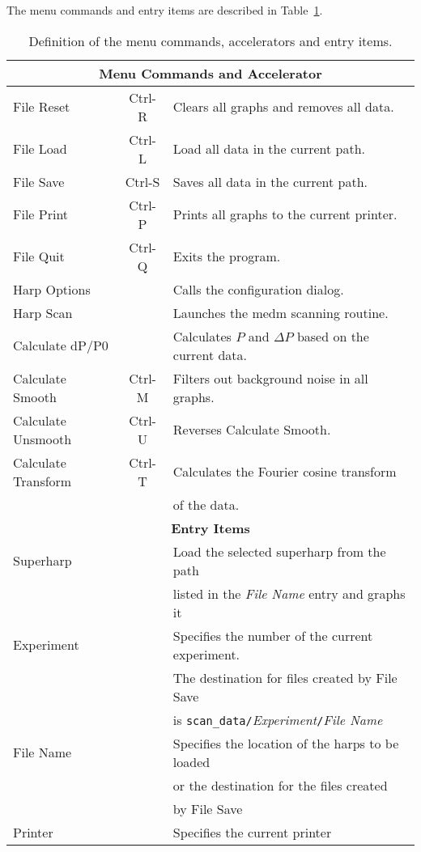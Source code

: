 {The menu commands and entry items are described in Table~\ref{table:menu_entry}.
\begin{table}
\begin{center}
\begin{tabular}{||l|c|l||}
\hline
\hline
\multicolumn{3}{|c|}{\bf Menu Commands and Accelerator}	\\
\hline
File Reset & Ctrl-R & Clears all graphs and removes all data. \\
File Load  & Ctrl-L & Load all data in the current path. \\
File Save  & Ctrl-S & Saves all data in the current path. \\
File Print & Ctrl-P & Prints all graphs to the current printer.\\
File Quit & Ctrl-Q & Exits the program. \\
\hline
Harp Options & & Calls the configuration dialog. \\
Harp Scan & & Launches the medm scanning routine. \\
\hline
Calculate dP/P0 & & Calculates $P$ and $\Delta P$ based on the current data. \\
Calculate Smooth & Ctrl-M & Filters out background noise in all graphs. \\
Calculate Unsmooth & Ctrl-U & Reverses Calculate Smooth. \\
Calculate Transform & Ctrl-T & Calculates the Fourier cosine transform \\
		& & of the data. \\
\hline
\hline
\multicolumn{3}{|c|}{\bf Entry Items}	\\
\hline
Superharp	& & Load the selected superharp from the path	\\
		& & listed in the {\it File Name} entry and graphs it		\\
Experiment	& & Specifies the number of the current experiment.	\\
		& & The destination for files created by File Save 	\\
		& & is {\tt scan\_data/}{\it{Experiment}}{\tt /}{\it File Name}	\\
File Name	& & Specifies the location of the harps to be loaded	\\
		& & or the destination for the files created			\\
		& & by File Save			\\
Printer		& & Specifies the current printer				\\
\hline
\hline
\end{tabular}
	\caption{Definition of the menu commands, accelerators and entry items.}\label{table:menu_entry}
\end{center}
\end{table}

}
